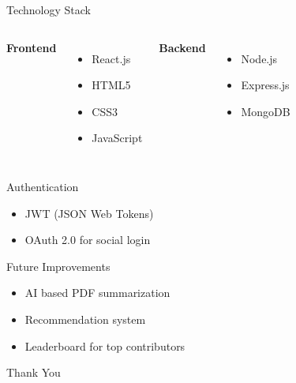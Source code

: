 \documentclass{beamer}
\begin{document}

\begin{frame}{Technology Stack}

\begin{columns}


\textbf{Frontend}
\begin{itemize}
\item React.js
\item HTML5
\item CSS3
\item JavaScript
\end{itemize}


\textbf{Backend}
\begin{itemize}
\item Node.js
\item Express.js
\item MongoDB
\end{itemize}

\end{columns}

\vspace{0.4cm}

\begin{block}{Authentication}
\begin{itemize}
\item JWT (JSON Web Tokens)
\item OAuth 2.0 for social login
\end{itemize}
\end{block}

\end{frame}




\begin{frame}{Future Improvements}

\begin{itemize}
\item AI based PDF summarization
\item Recommendation system
\item Leaderboard for top contributors
\end{itemize}

\end{frame}


\begin{frame}
\centering
\Huge Thank You
\end{frame}
\end{document}
